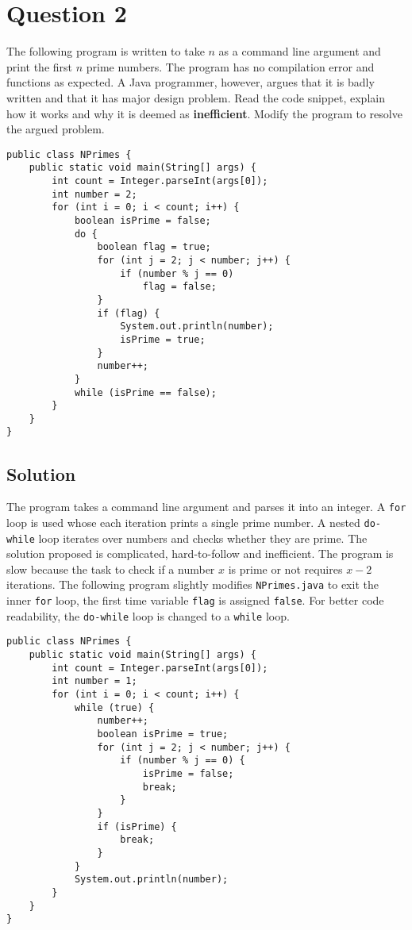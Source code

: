 \section*{Question 2}
The following program is written to take $n$ as a command line argument and print the first $n$ prime numbers.
The program has no compilation error and functions as expected.
A Java programmer, however, argues that it is badly written and that it has major design problem.
Read the code snippet, explain how it works and why it is deemed as \textbf{inefficient}.
Modify the program to resolve the argued problem.

\begin{lstlisting}
public class NPrimes {
	public static void main(String[] args) {
		int count = Integer.parseInt(args[0]);
		int number = 2;
		for (int i = 0; i < count; i++) {
			boolean isPrime = false;
			do {
				boolean flag = true;
				for (int j = 2; j < number; j++) {
					if (number % j == 0)
						flag = false;
				}
				if (flag) {
					System.out.println(number);
					isPrime = true;
				}
				number++;
			}
			while (isPrime == false);
		}
	}
}
\end{lstlisting}

\newpage

\subsection*{Solution}

The program takes a command line argument and parses it into an integer.
A \texttt{for} loop is used whose each iteration prints a single prime number.
A nested \texttt{do-while} loop iterates over numbers and checks whether they are prime.
The solution proposed is complicated, hard-to-follow and inefficient.
The program is slow because the task to check if a number $x$ is prime or not requires $x - 2$ iterations.
The following program slightly modifies \texttt{NPrimes.java} to exit the inner \texttt{for} loop, the first time variable \texttt{flag} is assigned \texttt{false}.
For better code readability, the \texttt{do-while} loop is changed to a \texttt{while} loop.

\lstset{language=Java,tabsize=4}
\begin{lstlisting}
public class NPrimes {
	public static void main(String[] args) {
		int count = Integer.parseInt(args[0]);
		int number = 1;
		for (int i = 0; i < count; i++) {
			while (true) {
				number++;
				boolean isPrime = true;
				for (int j = 2; j < number; j++) {
					if (number % j == 0) {
						isPrime = false;
						break;
					}
				}
				if (isPrime) {
					break;
				}
			}
			System.out.println(number);
		}
	}
}
\end{lstlisting}

